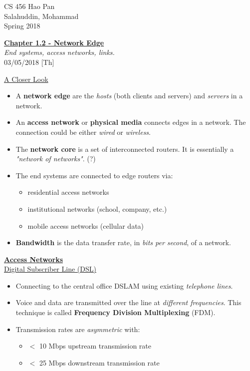 \documentclass{article}
\begin{document}
\noindent
{CS 456 \hfill Hao Pan}\\
{Salahuddin, Mohammad}\\
{Spring 2018}


\begin{center}
\underline{\large \bf Chapter 1.2 - Network Edge}\\

{\it End systems, access networks, links.}\\

\noindent
{\hfill 03/05/2018 [Th]}
\end{center}

\underline{A Closer Look}

\begin{itemize}
\item A {\bf network edge} are the {\it hosts} (both clients and servers) and {\it servers} in a network.
\item An {\bf access network} or {\bf physical media} connects edges in a network. The connection could be either {\it wired} or {\it wireless}.
\item The {\bf network core} is a set of interconnected routers. It is essentially a {\it "network of networks"}. (?)
\item The end systems are connected to edge routers via:
\begin{itemize}
\item residential access networks
\item institutional networks (school, company, etc.)
\item mobile access networks (cellular data)
\end{itemize}
\item {\bf Bandwidth} is the data transfer rate, in {\it bits per second}, of a network.
\end{itemize}

\bigskip

\underline{\bf Access Networks}\\

\underline{Digital Subscriber Line (DSL)}

\begin{itemize}
\item Connecting to the central office DSLAM using existing {\it telephone lines}.
\item Voice and data are transmitted over the line at {\it different frequencies}. This technique is called {\bf Frequency Division Multiplexing} (FDM).
\item Transmission rates are {\it asymmetric} with:
\begin{itemize}
\item $<$ 10 Mbps upstream transmission rate
\item $<$ 25 Mbps downstream transmission rate
\end{itemize}
\end{itemize}
\end{document}

